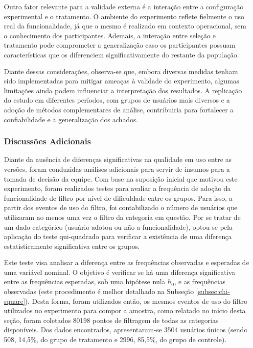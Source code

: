 Outro fator relevante para a validade externa é a interação entre a configuração experimental e o tratamento. O ambiente do experimento reflete fielmente o uso real da funcionalidade, já que o mesmo é realizado em contexto operacional, sem o conhecimento dos participantes. Ademais, a interação entre seleção e tratamento pode comprometer a generalização caso os participantes possuam características que os diferenciem significativamente do restante da população.

Diante dessas considerações, observa-se que, embora diversas medidas tenham sido implementadas para mitigar ameaças à validade do experimento, algumas limitações ainda podem influenciar a interpretação dos resultados. A replicação do estudo em diferentes períodos, com grupos de usuários mais diversos e a adoção de métodos complementares de análise, contribuiria para fortalecer a confiabilidade e a generalização dos achados.


\subsubsection{Discussões Adicionais}

Diante da ausência de diferenças significativas na qualidade em uso entre as versões, foram conduzidas análises adicionais para servir de insumos para a tomada de decisão da equipe. Com base na suposição inicial que motivou este experimento, foram realizados testes para avaliar a frequência de adoção da funcionalidade de filtro por nível de dificuldade entre os grupos. Para isso, a partir dos eventos de uso do filtro, foi contabilizado o número de usuários que utilizaram ao menos uma vez o filtro da categoria em questão. Por se tratar de um dado categórico (usuário adotou ou não a funcionalidade), optou-se pela aplicação do teste qui-quadrado para verificar a existência de uma diferença estatisticamente significativa entre os grupos.

Este teste visa analisar a diferença entre as frequências observadas e esperadas de uma variável nominal. O objetivo é verificar se há uma diferença significativa entre as frequências esperadas, sob uma hipótese nula \(h_0\), e as frequências observadas (este procedimento é melhor detalhado na Subseção \ref{subsec:chi-square}). Desta forma, foram utilizados então, os mesmos eventos de uso do filtro utilizados no experimento para compor a amostra, como relatado no início desta seção, foram coletados 80198 pontos de filtragem de todas as categorias disponíveis. Dos dados encontrados, apresentaram-se 3504 usuários únicos (sendo 508, 14,5\%, do grupo de tratamento e 2996, 85,5\%, do grupo de controle).


